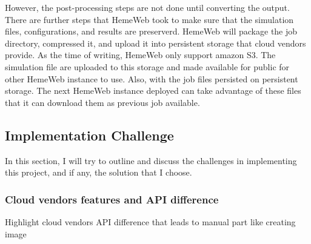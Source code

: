 However, the post-processing steps are not done until converting the output. There are further steps that HemeWeb took to make sure that the simulation files, configurations, and results are preserverd. HemeWeb will package the job directory, compressed it, and upload it into persistent storage that cloud vendors provide. As the time of writing, HemeWeb only support amazon S3. The simulation file are uploaded to this storage and made available for public for other HemeWeb instance to use. Also, with the job files persisted on persistent storage. The next HemeWeb instance deployed can take advantage of these files that it can download them as previous job available.







\subsection{Implementation Challenge}


In this section, I will try to outline and discuss the challenges in implementing this project, and if any, the solution that I choose.

\subsubsection{Cloud vendors features and API difference}

Highlight cloud vendors API difference that leads to manual part like creating image


\vspace{1cm}

\noindent%
\begin{minipage}{\linewidth}%
\label{fig:hemeweb-challenge-1}%
\end{minipage}

